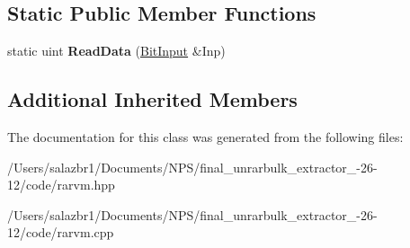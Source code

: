 \subsection*{Static Public Member Functions}
\begin{DoxyCompactItemize}
\item 
\hypertarget{class_rar_v_m_a6eb3a8147b369f1e3b22adb796cbd94c}{static uint {\bfseries Read\-Data} (\hyperlink{class_bit_input}{Bit\-Input} \&Inp)}\label{class_rar_v_m_a6eb3a8147b369f1e3b22adb796cbd94c}

\end{DoxyCompactItemize}
\subsection*{Additional Inherited Members}


The documentation for this class was generated from the following files\-:\begin{DoxyCompactItemize}
\item 
/\-Users/salazbr1/\-Documents/\-N\-P\-S/final\-\_\-unrarbulk\-\_\-extractor\-\_-\/26-\/12/code/rarvm.\-hpp\item 
/\-Users/salazbr1/\-Documents/\-N\-P\-S/final\-\_\-unrarbulk\-\_\-extractor\-\_-\/26-\/12/code/rarvm.\-cpp\end{DoxyCompactItemize}
